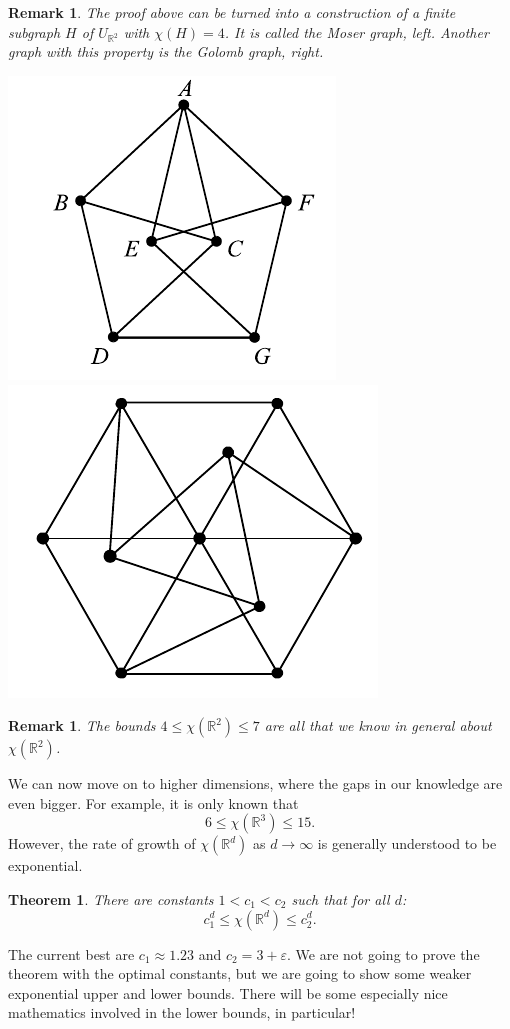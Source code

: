 \documentclass[a4paper]{article}
\theoremstyle{plain}
\newtheorem{theorem}[lemma]{Theorem}
\theoremstyle{myremark}
\newtheorem{remark}[lemma]{Remark}
\newcommand{\RR}{\mathbb{R}}
\begin{document}
\begin{remark}
The proof above can be turned into a construction of a finite subgraph $H$ of $U_{\RR^2}$ with $\chi(H)=4$. It is called the Moser graph, left. Another graph with this property is the Golomb graph, right.
\begin{center}
\includegraphics[scale=0.4]{mf6.png}
\includegraphics[scale=0.4]{mf7.png}
\end{center}
\end{remark}
\begin{remark}
The bounds $4\leq\chi(\RR^2)\leq 7$ are all that we know in general about $\chi(\RR^2)$.
\end{remark}


We can now move on to higher dimensions, where the gaps in our knowledge are even bigger. For example, it is only known that
$$6\leq\chi(\RR^3)\leq 15.$$
However, the rate of growth of $\chi(\RR^d)$ as $d\to\infty$ is generally understood to be exponential.

\begin{theorem}
There are constants $1<c_1<c_2$ such that for all $d$:
$$c_1^d\leq \chi(\RR^d)\leq c_2^d.$$
\end{theorem}
The current best are $c_1\approx 1.23$ and $c_2=3+\varepsilon$. We are not going to prove the theorem with the optimal constants, but we are going to show some weaker exponential upper and lower bounds. There will be some especially nice mathematics involved in the lower bounds, in particular!
\end{document}

